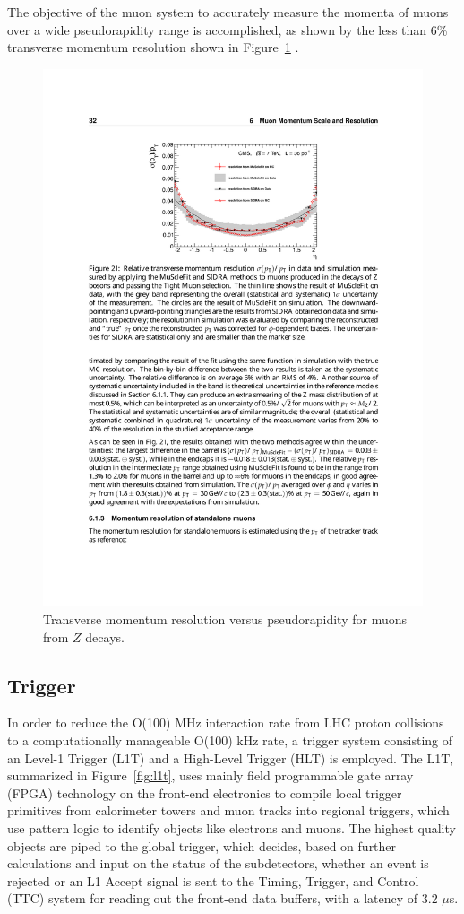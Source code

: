 \indent The objective of the muon system to accurately measure the momenta of muons over a wide pseudorapidity range is accomplished, as shown by the less than 6\% transverse momentum resolution shown in Figure~\ref{fig:muonres} \cite{1748-0221-7-10-P10002}.

\begin{figure}[tbh]
\centering
\includegraphics[width=5in]{figures/muonres.pdf}
\caption{Transverse momentum resolution versus pseudorapidity for muons from $Z$ decays.}
\label{fig:muonres}
\end{figure}

\subsection{Trigger}

In order to reduce the O(100) MHz interaction rate from LHC proton collisions to a computationally manageable O(100) kHz rate, a trigger system consisting of an Level-1 Trigger (L1T) and a High-Level Trigger (HLT) is employed. The L1T, summarized in Figure~\ref{fig:l1t}, uses mainly field programmable gate array (FPGA) technology on the front-end electronics to compile local trigger primitives from calorimeter towers and muon tracks into regional triggers, which use pattern logic to identify objects like electrons and muons. The highest quality objects are piped to the global trigger, which decides, based on further calculations and input on the status of the subdetectors, whether an event is rejected or an L1 Accept signal is sent to the Timing, Trigger, and Control (TTC) system for reading out the front-end data buffers, with a latency of 3.2 $\mu$s.


